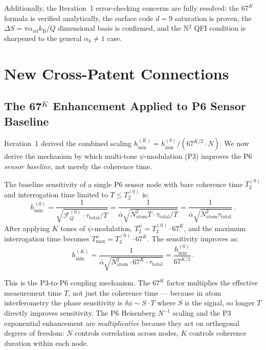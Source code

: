 \documentclass[11pt]{article}
\theoremstyle{definition}
\theoremstyle{remark}
\newcommand{\kB}{k_{\mathrm{B}}}
\newcommand{\hmin}{h_{\min}}
\begin{document}
Additionally, the Iteration~1 error-checking concerns are fully resolved:
the $67^K$ formula is verified analytically, the surface code $d=9$ saturation
is proven, the $\Delta S = \pi\alpha_{\mathrm{rel}}\kB/Q$ dimensional basis is
confirmed, and the N$^2$ QFI condition is sharpened to the general
$\alpha_k \neq 1$ case.

\section{New Cross-Patent Connections}
\label{sec:new-connections}

\subsection{The 67$^K$ Enhancement Applied to P6 Sensor Baseline}

Iteration~1 derived the combined scaling $\hmin^{(K)} = \hmin^{(0)}/(67^{K/2}
\cdot N)$. We now derive the mechanism by which multi-tone $\psi$-modulation
(P3) improves the P6 \emph{sensor baseline}, not merely the coherence time.

The baseline sensitivity of a single P6 sensor node with bare coherence time
$T_2^{(0)}$ and interrogation time limited to $T \leq T_2^{(0)}$ is:
\begin{equation}
\hmin^{(0)} = \frac{1}{\sqrt{\mathcal{F}_Q^{(0)} \cdot \tau_{\mathrm{total}}/T}}
= \frac{1}{\bar{\alpha}\sqrt{N_{\mathrm{atom}}^2 T \cdot \tau_{\mathrm{total}}/T}}
= \frac{1}{\bar{\alpha}\sqrt{N_{\mathrm{atom}}^2 \tau_{\mathrm{total}}}}\,.
\end{equation}
After applying $K$ tones of $\psi$-modulation, $T_2^{\psi} = T_2^{(0)} \cdot
67^K$, and the maximum interrogation time becomes $T_{\max}^{\psi} = T_2^{(0)}
\cdot 67^K$. The sensitivity improves as:
\begin{equation}
\boxed{
\hmin^{(K)} = \frac{1}{\bar{\alpha}\sqrt{N_{\mathrm{atom}}^2 \cdot 67^K \cdot
\tau_{\mathrm{total}}}} = \frac{\hmin^{(0)}}{67^{K/2}}\,.
}
\label{eq:hmin-K}
\end{equation}

This is the P3-to-P6 coupling mechanism. The $67^K$ factor multiplies the
effective measurement time $T$, not just the coherence time --- because in
atom interferometry the phase sensitivity is $\delta\phi \sim S \cdot T$ where
$S$ is the signal, so longer $T$ directly improves sensitivity. The P6
Heisenberg $N^{-1}$ scaling and the P3 exponential enhancement are
\emph{multiplicative} because they act on orthogonal degrees of freedom:
$N$ controls correlation across nodes, $K$ controls coherence duration within
each node.
\end{document}
